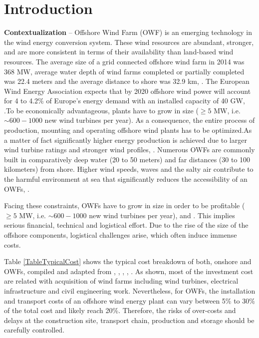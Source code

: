 \section{Introduction}
\label{Sec-Introduction}
\textbf{Contextualization} --
Offshore Wind Farm (OWF) is an emerging technology in the wind energy conversion system. These wind resources are abundant, stronger, and are more consistent in terms of their availability than land-based wind resources. The average size of a grid connected offshore wind farm in 2014 was 368 MW, average water depth of wind farms completed or partially completed was 22.4 meters and the average distance to shore was 32.9 km, \cite{Giorgio2015}. The European Wind Energy Association expects that by 2020 offshore wind power will account for 4 to 4.2\% of Europe's energy demand with an installed capacity of 40 GW, \cite{EWEA2011, Kaldellis2013}.To be economically advantageous, plants have to grow in size ($\geq 5$ MW, i.e. $\sim600-1000$ new wind turbines per year). As a consequence, the entire process of production, mounting and operating offshore wind plants has to be optimized.As a matter of fact significantly higher energy production is achieved due to larger wind turbine ratings and stronger wind profiles, \cite{Sun2012298}. Numerous OWFs are commonly built in comparatively deep water (20 to 50 meters) and far distances (30 to 100 kilometers) from shore. Higher wind speeds, waves and the salty air contribute to the harmful environment at sea that significantly reduces the accessibility of an OWFs, \cite{Smit2007}.



Facing these constraints, OWFs have to grow in size in order to be profitable ($\geq 5$ MW, i.e. $\sim600-1000$ new wind turbines per year), \cite{EWEA2011} and \cite{Kaldellis2013}. This implies serious financial, technical and logistical effort. Due to the rise of the size of the offshore components, logistical challenges arise, which often induce immense costs.

Table \ref{TableTypicalCost} shows the typical cost breakdown of both, onshore and OWFs, compiled and adapted from \cite{Henderson2003}, \cite{Junginger2004}, \cite{UK10}, \cite{TCE12}, \cite{IRENA12}. As shown, most of the investment cost are related with acquisition of wind farms including wind turbines, electrical infrastructure and civil engineering work. Nevertheless, for OWFs, the installation and transport costs of an offshore wind energy plant can vary between 5\% to 30\% of the total cost and likely reach 20\%. Therefore, the risks of over-costs and delays at the construction site, transport chain, production and storage should be carefully controlled.

